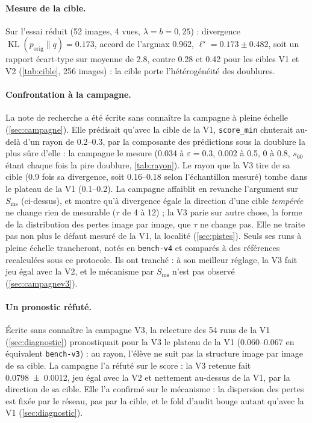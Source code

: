 \documentclass[11pt,a4paper]{article}
\newcommand{\KL}{\operatorname{KL}}
\newcommand{\orig}{\mathrm{orig}}
\newcommand{\code}[1]{\texttt{#1}}
\begin{document}
\paragraph{Mesure de la cible.} Sur l'essai réduit (52 images, 4 vues, $\lambda=b=0{,}25$) : divergence
$\KL(p_\orig\|q)=\num{0.173}$, accord de l'argmax \num{0.962}, $\ell^\star=\num{0.173}\pm\num{0.482}$,
soit un rapport écart-type sur moyenne de \num{2.8}, contre \num{0.28} et \num{0.42} pour les cibles V1
et V2 (\cref{tab:cible}, 256 images) : la cible porte l'hétérogénéité des doublures.

\paragraph{Confrontation à la campagne.} La note de recherche a été écrite sans connaître la
campagne à pleine échelle (\cref{sec:campagne}). Elle prédisait qu'avec la cible de la V1,
\code{score\_min} chuterait au-delà d'un rayon de \numrange{0.2}{0.3}, par la composante des
prédictions sous la doublure la plus sûre d'elle : la campagne le mesure (\num{0.034} à
$\varepsilon=\num{0.3}$, \num{0.002} à \num{0.5}, 0 à \num{0.8}, $s_{60}$ étant chaque fois la pire
doublure, \cref{tab:rayon}). Le rayon que la V3 tire de sa cible (\num{0.9} fois sa divergence, soit
\numrange{0.16}{0.18} selon l'échantillon mesuré) tombe dans le plateau de la V1
(\numrange{0.1}{0.2}). La campagne affaiblit en revanche l'argument sur $S_{\text{ms}}$ (ci-dessus),
et montre qu'à divergence égale la direction d'une cible \emph{tempérée} ne change rien de
mesurable ($\tau$ de 4 à 12) ; la V3 parie sur autre chose, la forme de la distribution des pertes
image par image, que $\tau$ ne change pas. Elle ne traite pas non plus le défaut mesuré de la V1, la
localité (\cref{sec:pistes}). Seuls ses runs à pleine échelle trancheront, notés en
\code{bench-v4} et comparés à des références recalculées sous ce protocole. Ils ont tranché : à son
meilleur réglage, la V3 fait jeu égal avec la V2, et le mécanisme par $S_{\text{ms}}$ n'est pas
observé (\cref{sec:campagnev3}).

\paragraph{Un pronostic réfuté.} Écrite sans connaître la campagne V3, la relecture des 54 runs de
la V1 (\cref{sec:diagnostic}) pronostiquait pour la V3 le plateau de la V1 (\numrange{0.060}{0.067}
en équivalent \code{bench-v3}) : au rayon, l'élève ne suit pas la structure image par image de sa
cible. La campagne l'a réfuté sur le score : la V3 retenue fait \num{0.0798 +- 0.0012}, jeu égal avec
la V2 et nettement au-dessus de la V1, par la direction de sa cible. Elle l'a confirmé sur le
mécanisme : la dispersion des pertes est fixée par le réseau, pas par la cible, et le fold d'audit
bouge autant qu'avec la V1 (\cref{sec:diagnostic}).
\end{document}
